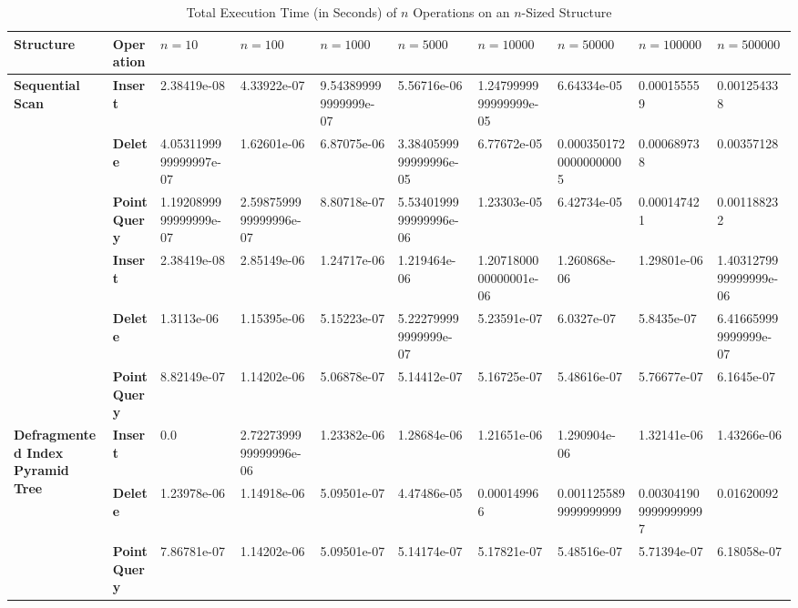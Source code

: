 \begin{landscape}
	\begin{table}
		\centering
		\begin{tabular}{|p{2cm}|l|l|l|l|l|l|l|l|l|}
			\hline
			\textbf{Structure} & \textbf{Operation} & $n = 10$ & $n = 100$ & $n = 1000$ & $n = 5000$ & $n = 10000$ & $n = 50000$ & $n = 100000$ & $n = 500000$ \\
			\hline
			\multirow{ 4}{*}{\textbf{Sequential Scan}} & \textbf{Insert} & 2.38419e-08 & 4.33922e-07 & 9.543899999999999e-07 & 5.56716e-06 & 1.2479999999999999e-05 & 6.64334e-05 & 0.000155559 & 0.001254338 \\ & \textbf{Delete} & 4.0531199999999997e-07 & 1.62601e-06 & 6.87075e-06 & 3.3840599999999996e-05 & 6.77672e-05 & 0.00035017200000000005 & 0.000689738 & 0.00357128 \\ & \textbf{Point Query} & 1.1920899999999999e-07 & 2.5987599999999996e-07 & 8.80718e-07 & 5.5340199999999996e-06 & 1.23303e-05 & 6.42734e-05 & 0.000147421 & 0.001188232 \\
			\hline
			\multirow{ 4}{*}{\textbf{Batch Index Pyramid Tree}} & \textbf{Insert} & 2.38419e-08 & 2.85149e-06 & 1.24717e-06 & 1.219464e-06 & 1.2071800000000001e-06 & 1.260868e-06 & 1.29801e-06 & 1.4031279999999999e-06 \\ & \textbf{Delete} & 1.3113e-06 & 1.15395e-06 & 5.15223e-07 & 5.222799999999999e-07 & 5.23591e-07 & 6.0327e-07 & 5.8435e-07 & 6.416659999999999e-07 \\ & \textbf{Point Query} & 8.82149e-07 & 1.14202e-06 & 5.06878e-07 & 5.14412e-07 & 5.16725e-07 & 5.48616e-07 & 5.76677e-07 & 6.1645e-07 \\
			\hline
			\multirow{ 4}{*}{\textbf{Defragmented Index Pyramid Tree}} & \textbf{Insert} & 0.0 & 2.7227399999999996e-06 & 1.23382e-06 & 1.28684e-06 & 1.21651e-06 & 1.290904e-06 & 1.32141e-06 & 1.43266e-06 \\ & \textbf{Delete} & 1.23978e-06 & 1.14918e-06 & 5.09501e-07 & 4.47486e-05 & 0.000149966 & 0.0011255899999999999 & 0.0030419099999999997 & 0.01620092 \\ & \textbf{Point Query} & 7.86781e-07 & 1.14202e-06 & 5.09501e-07 & 5.14174e-07 & 5.17821e-07 & 5.48516e-07 & 5.71394e-07 & 6.18058e-07 \\
			\hline
		\end{tabular}
		\caption{Total Execution Time (in Seconds) of $n$ Operations on an $n$-Sized Structure}
		\label{tab:perf1-sizevary}
	\end{table}


\end{landscape}
